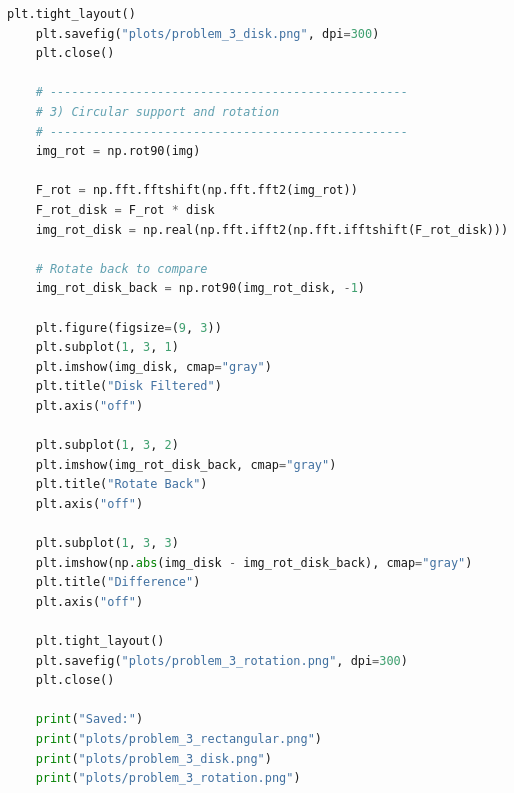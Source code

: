 \documentclass[11pt]{article}
\begin{document}
\begin{lstlisting}[language=Python]
	plt.tight_layout()
	plt.savefig("plots/problem_3_disk.png", dpi=300)
	plt.close()
	
	# --------------------------------------------------
	# 3) Circular support and rotation
	# --------------------------------------------------
	img_rot = np.rot90(img)
	
	F_rot = np.fft.fftshift(np.fft.fft2(img_rot))
	F_rot_disk = F_rot * disk
	img_rot_disk = np.real(np.fft.ifft2(np.fft.ifftshift(F_rot_disk)))
	
	# Rotate back to compare
	img_rot_disk_back = np.rot90(img_rot_disk, -1)
	
	plt.figure(figsize=(9, 3))
	plt.subplot(1, 3, 1)
	plt.imshow(img_disk, cmap="gray")
	plt.title("Disk Filtered")
	plt.axis("off")
	
	plt.subplot(1, 3, 2)
	plt.imshow(img_rot_disk_back, cmap="gray")
	plt.title("Rotate Back")
	plt.axis("off")
	
	plt.subplot(1, 3, 3)
	plt.imshow(np.abs(img_disk - img_rot_disk_back), cmap="gray")
	plt.title("Difference")
	plt.axis("off")
	
	plt.tight_layout()
	plt.savefig("plots/problem_3_rotation.png", dpi=300)
	plt.close()
	
	print("Saved:")
	print("plots/problem_3_rectangular.png")
	print("plots/problem_3_disk.png")
	print("plots/problem_3_rotation.png")
	\end{lstlisting}
	
	
\end{document}
